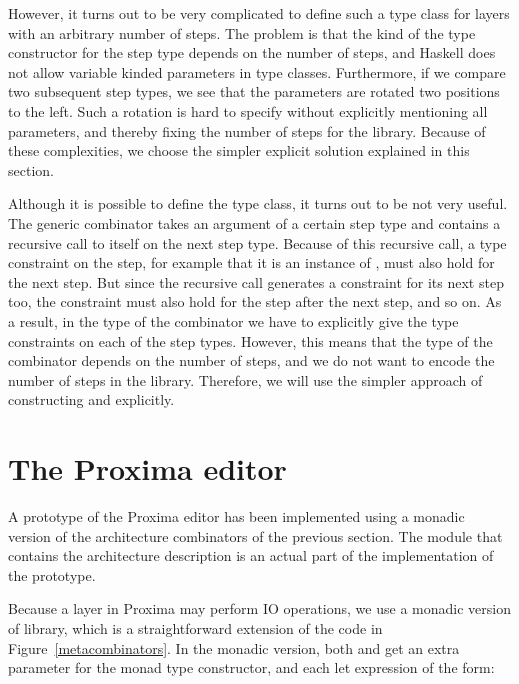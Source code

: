 However, it turns out to be very complicated to define such a type class for layers with an arbitrary number of steps. The problem is that the kind of the type constructor for the step type depends on the number of steps, and Haskell does not allow variable kinded parameters in type classes. Furthermore, if we compare two subsequent step types, we see that the parameters are rotated two positions to the left. Such a rotation is hard to specify without explicitly mentioning all parameters, and thereby fixing the number of steps for the library. Because of these complexities, we choose the simpler explicit solution explained in this section.


\bc Although it is possible to define the type class, it turns out to be not very useful. The generic combinator takes an argument of a certain step type and contains a recursive call to itself on the next step type. Because of this recursive call, a type constraint on the step, for example that it is an instance of , must also hold for the next step. But since the recursive call generates a constraint for its next step too, the constraint must also hold for the step after the next step, and so on. As a result, in the type of the combinator we have to explicitly give the type constraints on each of the step types. However, this means that the type of the combinator depends on the number of steps, and we do not want to encode the number of steps in the library. Therefore, we will use the simpler approach of constructing  and  explicitly. \ec






%																
%																
%																
\section{The Proxima editor} \label{sect:proxima}


A prototype of the Proxima editor has been implemented using a monadic version of the architecture combinators of the previous section. The module that contains the architecture description is an actual part of the implementation of the prototype.


Because a layer in Proxima may perform IO operations, we use a monadic version of library, which is a straightforward extension of the code in Figure~\ref{metacombinators}. In the monadic version, both  and  get an extra parameter  for the monad type constructor, and each let expression of the  form:

